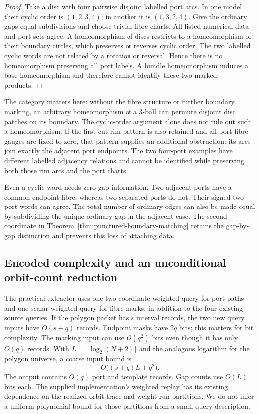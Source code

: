 \begin{proof}
Take a disc with four pairwise disjoint labelled port arcs.  In one model
their cyclic order is $(1,2,3,4)$; in another it is $(1,3,2,4)$.  Give the
ordinary gaps equal subdivisions and choose trivial fibre charts.  All
listed numerical data and port sets agree.  A homeomorphism of discs
restricts to a homeomorphism of their boundary circles, which preserves or
reverses cyclic order.  The two labelled cyclic words are not related by a
rotation or reversal.  Hence there is no homeomorphism preserving all port
labels.  A bundle homeomorphism induces a base homeomorphism and therefore
cannot identify these two marked products.
\end{proof}

The category matters here: without the fibre structure or further boundary
marking, an arbitrary homeomorphism of a 3-ball can permute disjoint disc
patches on its boundary.  The cyclic-order argument alone does not rule out
such a homeomorphism.  If the first-cut rim pattern is also retained and all
port fibre gauges are fixed to zero, that pattern supplies an additional
obstruction: its arcs join exactly the adjacent port endpoints.  The two
four-port examples have different labelled adjacency relations and cannot
be identified while preserving both those rim arcs and the port charts.

Even a cyclic word needs zero-gap information.  Two adjacent ports have a
common endpoint fibre, whereas two separated ports do not.  Their signed
two-port words can agree.  The total number of ordinary edges can also be
made equal by subdividing the unique ordinary gap in the adjacent case.
The second coordinate in Theorem~\ref{thm:punctured-boundary-matching}
retains the gap-by-gap distinction and prevents this loss of attaching data.

\subsection{Encoded complexity and an unconditional orbit-count reduction}

The practical extractor uses one two-coordinate weighted query for port
paths and one scalar weighted query for fibre marks, in addition to the
four existing source queries.  If the polygon packet has $s$ interval
records, the two new query inputs have $O(s+q)$ records.  Endpoint masks
have $2q$ bits; this matters for bit complexity.  The marking input can use
$O(q^2)$ bits even though it has only $O(q)$ records.  With
$L=\lceil\log_2(N+2)\rceil$ and the analogous logarithm for the polygon
universe, a coarse input bound is
\[
 O\bigl((s+q)L+q^2\bigr).
\]
The output contains $O(q)$ port and template records.  Gap counts use
$O(L)$ bits each.  The supplied implementation's weighted replay has its
existing dependence on the realized orbit trace and weight-run partitions.
We do not infer a uniform polynomial bound for those partitions from a
small query description.

